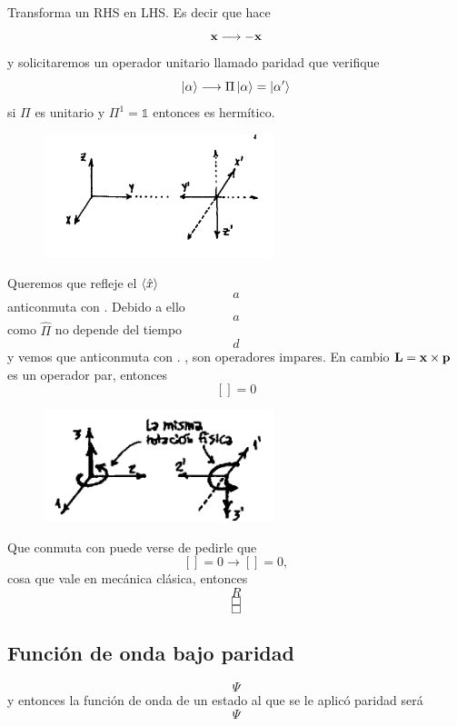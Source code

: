 \documentclass[10pt,oneside]{CBFT_book}
\begin{document}
Transforma un RHS en LHS. Es decir que hace 
\[
	\vb{x} \longrightarrow - \vb{x}
\]
y solicitaremos un operador unitario llamado paridad que verifique 
\[
	\Ket{\alpha} \longrightarrow \Pi\Ket{\alpha} = \Ket{\alpha'}
\]
si $\Pi$ es unitario y $\Pi^1=\mathbb{1}$ entonces es hermítico.
\begin{figure}[htb]
	\begin{center}
	\includegraphics[width=0.6\textwidth]{images/teo2_16.pdf}
	\end{center}
	\caption{}
\end{figure} 
Queremos que refleje el $\Braket{\hat{x}}$ 
\[
	a
\]
anticonmuta con .
Debido a ello 
\[
	a
\]
como $\hat{\Pi}$ no depende del tiempo 
\[
	d
\]
y vemos que anticonmuta con .
,  son operadores impares. En cambio $\vb{L}=\vb{x}\times\vb{p}$ es un operador par, entonces 
\[
	[] = 0
\]
\begin{figure}[htb]
	\begin{center}
	\includegraphics[width=0.6\textwidth]{images/teo2_17.pdf}
	\end{center}
	\caption{}
\end{figure} 
Que conmuta con  puede verse de pedirle que 
\[
	[] = 0 \longrightarrow [] = 0 ,
\]
cosa que vale en mecánica clásica, entonces 
\[
	R
\]
\[
	\Box
\]
\[
	\Box
\]

\subsection{Función de onda bajo paridad}

\[
	\Psi
\]
y entonces la función de onda de un estado al que se le aplicó paridad será 
\[
	\Psi
\]
\end{document}
